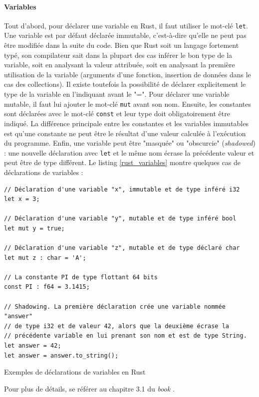 \documentclass[a4paper, 12pt]{article}
\newenvironment{code}{\captionsetup{type=listing}}{}
\begin{document}
\paragraph{Variables}
Tout d'abord, pour déclarer une variable en Rust, il faut utiliser le mot-clé \texttt{let}. Une variable 
est par défaut déclarée immutable, c'est-à-dire qu'elle ne peut pas être modifiée dans la suite du 
code. Bien que Rust soit un langage fortement typé, son compilateur sait dans la plupart des cas 
inférer le bon type de la variable, soit en analysant la valeur attribuée, soit en analysant la 
première utilisation de la variable (arguments d'une fonction, insertion de données dans le cas 
des collections). Il existe toutefois la possibilité de déclarer explicitement le type de la variable 
en l'indiquant avant le "=". Pour déclarer une variable mutable, il faut lui ajouter le mot-clé 
\texttt{mut} avant son nom. Ensuite, les constantes sont déclarées avec le mot-clé \texttt{const} 
et leur type doit obligatoirement être indiqué. La différence principale entre les constantes et 
les variables immutables est qu'une constante ne peut être le résultat d'une valeur calculée à 
l'exécution du programme. Enfin, une variable peut être "masquée" ou "obscurcie" (\textit{shadowed}) : 
une nouvelle déclaration avec \texttt{let} et le même nom écrase la précédente valeur et 
peut être de type différent. Le listing \ref{rust_variables} montre quelques cas de déclarations de variables :
\bigbreak
\begin{code}
    \begin{verbatim}
// Déclaration d'une variable "x", immutable et de type inféré i32
let x = 3;

// Déclaration d'une variable "y", mutable et de type inféré bool
let mut y = true;

// Déclaration d'une variable "z", mutable et de type déclaré char
let mut z : char = 'A';

// La constante PI de type flottant 64 bits
const PI : f64 = 3.1415;

// Shadowing. La première déclaration crée une variable nommée "answer"
// de type i32 et de valeur 42, alors que la deuxième écrase la 
// précédente variable en lui prenant son nom et est de type String.
let answer = 42;
let answer = answer.to_string();
    \end{verbatim}
    \caption{Exemples de déclarations de variables en Rust}
    \label{rust_variables}
\end{code}
\bigbreak
Pour plus de détails, se référer au chapitre 3.1 du \textit{book} \cite{ref0}.
\end{document}

